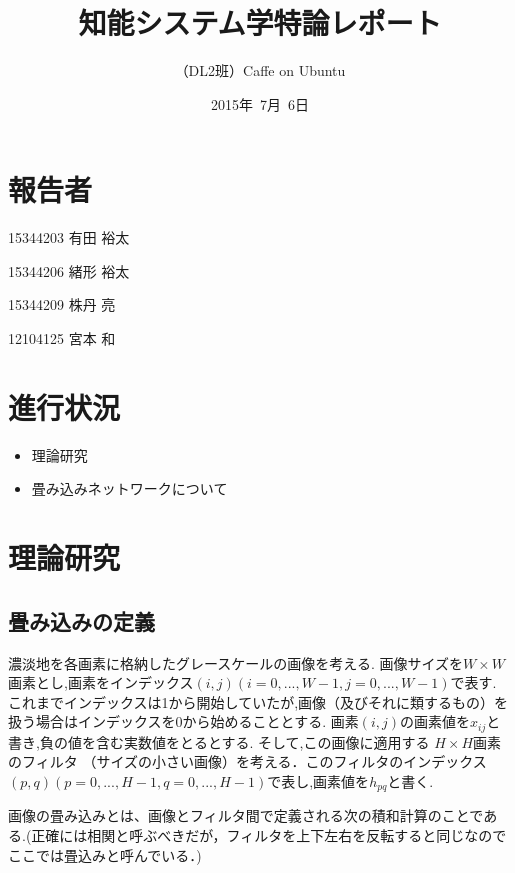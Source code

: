 \documentclass[a4paper,10pt]{jsarticle}
\title{知能システム学特論レポート}
\author{
（DL2班）Caffe on Ubuntu\\
}
\date{2015年\ 7月\ 6日}
\begin{document}
\maketitle
\section{報告者}
\begin{list}{}{}
 \item 15344203\hspace{0.5cm} 有田 裕太
 \item 15344206\hspace{0.5cm} 緒形 裕太
 \item 15344209\hspace{0.5cm} 株丹 亮
 \item 12104125\hspace{0.5cm} 宮本 和
\end{list}

\section{進行状況}

\begin{itemize}
\item 理論研究
\item 畳み込みネットワークについて
\end{itemize}

\section{理論研究}

\subsection{畳み込みの定義}

濃淡地を各画素に格納したグレースケールの画像を考える.
画像サイズを$W×W$画素とし,画素をインデックス$(i,j)(i = 0,...,W-1, j = 0,...,W-1)$で表す.
これまでインデックスは1から開始していたが,画像（及びそれに類するもの）を扱う場合はインデックスを0から始めることとする.
画素$(i,j)$の画素値を$x_{ij}$と書き,負の値を含む実数値をとるとする.
そして,この画像に適用する $H×H$画素のフィルタ
（サイズの小さい画像）を考える．このフィルタのインデックス$(p,q)(p=0,...,H-1, q=0,...,H-1)$で表し,画素値を$h_{pq}$と書く.

画像の畳み込みとは、画像とフィルタ間で定義される次の積和計算のことである.(正確には相関と呼ぶべきだが，フィルタを上下左右を反転すると同じなのでここでは畳込みと呼んでいる．)
\end{document}
